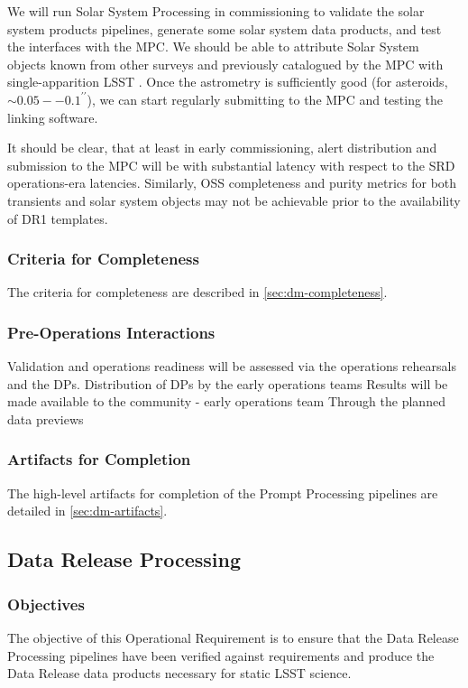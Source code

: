 We will run Solar System Processing in commissioning to validate the solar system products pipelines, generate some solar system data products, and test the interfaces with the MPC. 
We should be able to attribute Solar System objects known from other surveys and previously catalogued by the MPC with single-apparition LSST \DIASources.
Once the astrometry is sufficiently good (for asteroids,  $\sim0.05--0.1^{\prime\prime}$), we can start regularly submitting to the MPC and testing the linking software. 

It should be clear, that at least in early commissioning, alert distribution and submission to the MPC will be with substantial latency with respect to the SRD operations-era latencies.  
Similarly, OSS completeness and purity metrics for both transients and solar system objects may not be achievable prior to the availability of DR1 templates.

\subsubsection{Criteria for Completeness}
The criteria for completeness are described in \ref{sec:dm-completeness}. 

\subsubsection{Pre-Operations Interactions}
Validation and operations readiness will be assessed via the operations rehearsals and the DPs. 
Distribution of DPs by the early operations teams
Results will be made available to the community - early operations team 
Through the planned data previews 

\subsubsection{Artifacts for Completion}
The high-level artifacts for completion of the Prompt Processing pipelines are detailed in \ref{sec:dm-artifacts}.  

\subsection{Data Release Processing}

\subsubsection{Objectives}
The objective of this Operational Requirement is to ensure that the Data Release Processing pipelines have been verified against requirements  and produce the Data Release data products necessary for static LSST science. 

